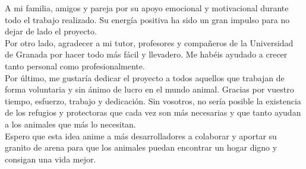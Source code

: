        \vspace{1cm}

A mi familia, amigos y pareja por su apoyo emocional y motivacional durante todo el trabajo realizado. Su energía positiva
ha sido un gran impulso para no dejar de lado el proyecto. \\

Por otro lado, agradecer a mi tutor, profesores y compañeros de la Universidad de Granada por hacer todo más fácil y
llevadero. Me habéis ayudado a crecer tanto personal como profesionalmente. \\

Por último, me gustaría dedicar el proyecto a todos aquellos que trabajan de forma voluntaria y sin ánimo de lucro en el mundo animal. Gracias por
vuestro tiempo, esfuerzo, trabajo y dedicación. Sin vosotros, no sería posible la existencia de los refugios y protectoras que cada
vez son más necesarias y que tanto ayudan a los animales que más lo necesitan. \\

Espero que esta idea anime a más desarrolladores a colaborar y aportar su granito de arena para que los animales puedan encontrar
un hogar digno y consigan una vida mejor. \\

